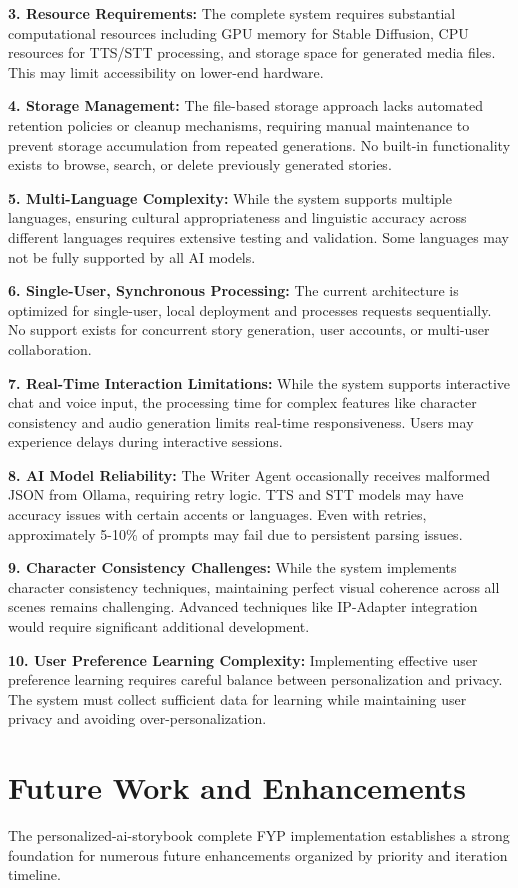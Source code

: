 \textbf{3. Resource Requirements:} The complete system requires substantial computational resources including GPU memory for Stable Diffusion, CPU resources for TTS/STT processing, and storage space for generated media files. This may limit accessibility on lower-end hardware.

\textbf{4. Storage Management:} The file-based storage approach lacks automated retention policies or cleanup mechanisms, requiring manual maintenance to prevent storage accumulation from repeated generations. No built-in functionality exists to browse, search, or delete previously generated stories.

\textbf{5. Multi-Language Complexity:} While the system supports multiple languages, ensuring cultural appropriateness and linguistic accuracy across different languages requires extensive testing and validation. Some languages may not be fully supported by all AI models.

\textbf{6. Single-User, Synchronous Processing:} The current architecture is optimized for single-user, local deployment and processes requests sequentially. No support exists for concurrent story generation, user accounts, or multi-user collaboration.

\textbf{7. Real-Time Interaction Limitations:} While the system supports interactive chat and voice input, the processing time for complex features like character consistency and audio generation limits real-time responsiveness. Users may experience delays during interactive sessions.

\textbf{8. AI Model Reliability:} The Writer Agent occasionally receives malformed JSON from Ollama, requiring retry logic. TTS and STT models may have accuracy issues with certain accents or languages. Even with retries, approximately 5-10\% of prompts may fail due to persistent parsing issues.

\textbf{9. Character Consistency Challenges:} While the system implements character consistency techniques, maintaining perfect visual coherence across all scenes remains challenging. Advanced techniques like IP-Adapter integration would require significant additional development.

\textbf{10. User Preference Learning Complexity:} Implementing effective user preference learning requires careful balance between personalization and privacy. The system must collect sufficient data for learning while maintaining user privacy and avoiding over-personalization.

\section{Future Work and Enhancements}
The personalized-ai-storybook complete FYP implementation establishes a strong foundation for numerous future enhancements organized by priority and iteration timeline.

